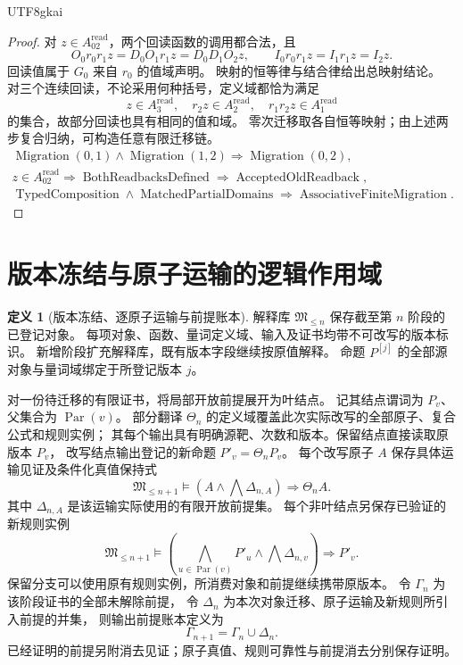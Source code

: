\documentclass[12pt,a4paper,openany,notitlepage]{report}
\theoremstyle{plain}
\theoremstyle{definition}
\newtheorem{definition}[theorem]{定义}
\theoremstyle{remark}
\def\mathcal#1{#1}\def\mathsf#1{#1}\def\mathbb#1{#1}%
\begin{document}
\begin{CJK*}{UTF8}{gkai}
\begin{proof}
对 $z\in\mathcal A_{02}^{\mathrm{read}}$，两个回读函数的调用都合法，且
\[
 O_0r_0r_1z=D_0O_1r_1z=D_0D_1O_2z,
 \qquad I_0r_0r_1z=I_1r_1z=I_2z.
\]
回读值属于 $G_0$ 来自 $r_0$ 的值域声明。
映射的恒等律与结合律给出总映射结论。
对三个连续回读，不论采用何种括号，定义域都恰为满足
\[
 z\in\mathcal A_3^{\mathrm{read}},\quad
 r_2z\in\mathcal A_2^{\mathrm{read}},\quad
 r_1r_2z\in\mathcal A_1^{\mathrm{read}}
\]
的集合，故部分回读也具有相同的值和域。
零次迁移取各自恒等映射；由上述两步复合归纳，可构造任意有限迁移链。
\[
\begin{gathered}
 \operatorname{Migration}(0,1)\land\operatorname{Migration}(1,2)
 \Rightarrow\operatorname{Migration}(0,2),\\
 z\in\mathcal A_{02}^{\mathrm{read}}
 \Rightarrow\operatorname{BothReadbacksDefined}
 \Rightarrow\operatorname{AcceptedOldReadback},\\
 \operatorname{TypedComposition}\land\operatorname{MatchedPartialDomains}
 \Rightarrow\operatorname{AssociativeFiniteMigration}.
\end{gathered}
\]
\end{proof}

\section{版本冻结与原子运输的逻辑作用域}
\label{exp:gov:version-atoms-section}

\begin{definition}[版本冻结、逐原子运输与前提账本]
\label{hgov:def:certificate-transport}
解释库 $\mathfrak M_{\le n}$ 保存截至第 $n$ 阶段的已登记对象。
每项对象、函数、量词定义域、输入及证书均带不可改写的版本标识。
新增阶段扩充解释库，既有版本字段继续按原值解释。
命题 $P^{[j]}$ 的全部源对象与量词域绑定于所登记版本 $j$。

对一份待迁移的有限证书，将局部开放前提展开为叶结点。
记其结点谓词为 $P_v$、父集合为 $\operatorname{Par}(v)$。
部分翻译 $\Theta_n$ 的定义域覆盖此次实际改写的全部原子、复合公式和规则实例；
其每个输出具有明确源靶、次数和版本。保留结点直接读取原版本 $P_v$，
改写结点输出登记的新命题 $P'_v=\Theta_nP_v$。
每个改写原子 $A$ 保存具体运输见证及条件化真值保持式
\[
 \mathfrak M_{\le n+1}\models
 \left(A\land\bigwedge\Delta_{n,A}\right)\Rightarrow\Theta_nA.
\]
其中 $\Delta_{n,A}$ 是该运输实际使用的有限开放前提集。
每个非叶结点另保存已验证的新规则实例
\[
 \mathfrak M_{\le n+1}\models
 \left(
 \bigwedge_{u\in\operatorname{Par}(v)}P'_u
 \land\bigwedge\Delta_{n,v}
 \right)\Rightarrow P'_v.
\]
保留分支可以使用原有规则实例，所消费对象和前提继续携带原版本。
令 $\Gamma_n$ 为该阶段证书的全部未解除前提，
令 $\Delta_n$ 为本次对象迁移、原子运输及新规则所引入前提的并集，
则输出前提账本定义为
\[
 \Gamma_{n+1}=\Gamma_n\cup\Delta_n.
\]
已经证明的前提另附消去见证；原子真值、规则可靠性与前提消去分别保存证明。
\end{definition}


\end{CJK*}
\end{document}
